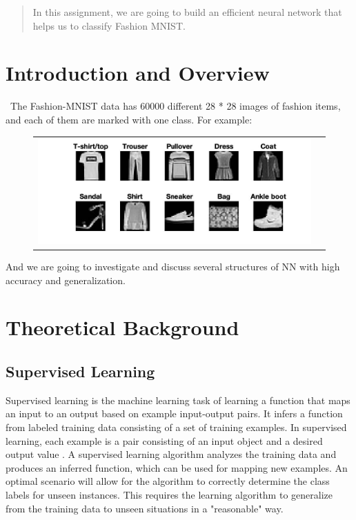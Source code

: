 \documentclass[12pt]{article}
\begin{document}
\maketitle

\begin{abstract}
In this assignment, we are going to build an efficient neural network that helps us to classify Fashion MNIST.
\end{abstract}

\section{Introduction and Overview}\
The Fashion-MNIST data has 60000 different 28 * 28 images of fashion items, and each of them are marked with one class. For example:
\begin{figure}[H]
\begin{tabular}{cc}
  \includegraphics[width=\textwidth]{fashion.jpg}
\end{tabular}
\end{figure}
And we are going to investigate and discuss several structures of NN with high accuracy and generalization.

\section{Theoretical Background}
\subsection{Supervised Learning}
Supervised learning is the machine learning task of learning a function that maps an input to an output based on example input-output pairs. It infers a function from labeled training data consisting of a set of training examples. In supervised learning, each example is a pair consisting of an input object and a desired output value . A supervised learning algorithm analyzes the training data and produces an inferred function, which can be used for mapping new examples. An optimal scenario will allow for the algorithm to correctly determine the class labels for unseen instances. This requires the learning algorithm to generalize from the training data to unseen situations in a "reasonable" way.
\end{document}
